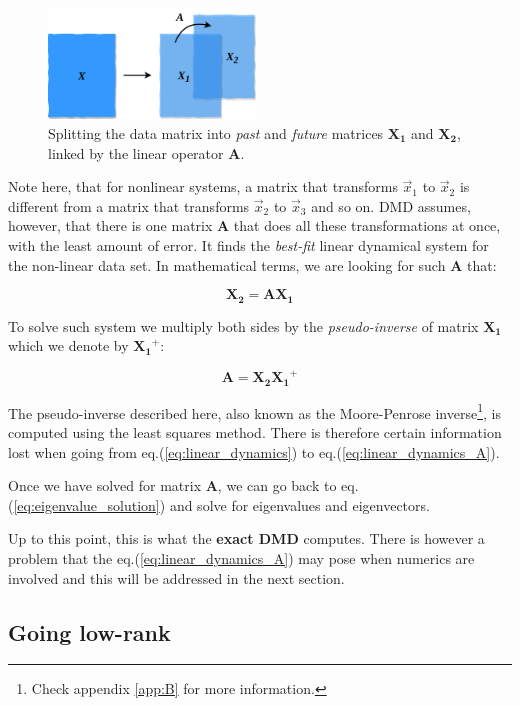 \documentclass[10pt,twocolumn]{article}
\begin{document}
\begin{figure}[H]
\centering\includegraphics[width=5.5cm]{data-split.png}
\caption{Splitting the data matrix into \textit{past} and \textit{future} matrices $\bm{X_1}$ and $\bm{X_2}$, linked by the linear operator $\bm{A}$.}
\label{fig:linear_system}
\end{figure}

Note here, that for nonlinear systems, a matrix that transforms $\vec{x}_1$ to $\vec{x}_2$ is different from a matrix that transforms $\vec{x}_2$ to $\vec{x}_3$ and so on. DMD assumes, however, that there is one matrix $\bm{A}$ that does all these transformations at once, with the least amount of error. It finds the \textit{best-fit} linear dynamical system for the non-linear data set. In mathematical terms, we are looking for such $\bm{A}$ that:

\begin{equation} \label{eq:linear_dynamics}
\bm{X_2} = \bm{A} \bm{X_1}
\end{equation}

To solve such system we multiply both sides by the \textit{pseudo-inverse} of matrix $\bm{X_1}$ which we denote by $\bm{X_1}^{+}$:

\begin{equation} \label{eq:linear_dynamics_A}
\bm{A} = \bm{X_2} \bm{X_1}^{+}
\end{equation}

The pseudo-inverse described here, also known as the Moore-Penrose inverse\footnote{Check appendix \ref{app:B} for more information.}, is computed using the least squares method. There is therefore certain information lost when going from eq.(\ref{eq:linear_dynamics}) to eq.(\ref{eq:linear_dynamics_A}).

Once we have solved for matrix $\bm{A}$, we can go back to eq.(\ref{eq:eigenvalue_solution}) and solve for eigenvalues and eigenvectors.

Up to this point, this is what the \textbf{exact DMD} computes. There is however a problem that the eq.(\ref{eq:linear_dynamics_A}) may pose when numerics are involved and this will be addressed in the next section. 

\subsection{Going low-rank}
\end{document}
